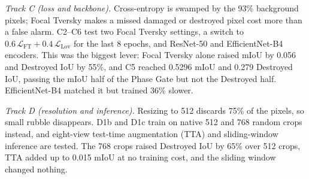 \documentclass[conference]{IEEEtran}
\begin{document}
\textit{Track C (loss and backbone).} Cross-entropy is swamped by the 93\% background pixels; Focal Tversky makes a missed damaged or destroyed pixel cost more than a false alarm. C2--C6 test two Focal Tversky settings, a switch to $0.6\,\mathcal{L}_{\mathrm{FT}}+0.4\,\mathcal{L}_{\mathrm{Lov}}$ for the last 8 epochs, and ResNet-50 and EfficientNet-B4 encoders. This was the biggest lever: Focal Tversky alone raised mIoU by 0.056 and Destroyed IoU by 55\%, and C5 reached 0.5296 mIoU and 0.279 Destroyed IoU, passing the mIoU half of the Phase Gate but not the Destroyed half. EfficientNet-B4 matched it but trained 36\% slower.

\textit{Track D (resolution and inference).} Resizing to 512 discards 75\% of the pixels, so small rubble disappears. D1b and D1c train on native 512 and 768 random crops instead, and eight-view test-time augmentation (TTA) and sliding-window inference are tested. The 768 crops raised Destroyed IoU by 65\% over 512 crops, TTA added up to 0.015 mIoU at no training cost, and the sliding window changed nothing.
\end{document}
